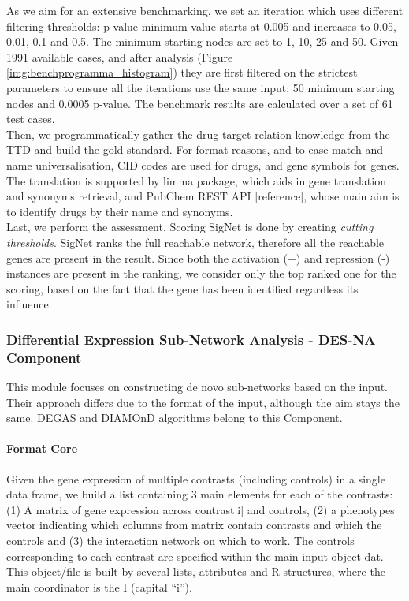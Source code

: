 As we aim for an extensive benchmarking, we set an iteration which uses different filtering thresholds: p-value minimum value starts at 0.005 and increases to 0.05, 0.01, 0.1 and 0.5. The minimum starting nodes are set to 1, 10, 25 and 50. Given 1991 available cases, and after analysis (Figure \ref{img:benchprogramma_histogram}) they are first filtered on the strictest parameters to ensure all the iterations use the same input: 50 minimum starting nodes and 0.0005 p-value. The benchmark results are calculated over a set of 61 test cases.
\\

Then, we programmatically gather the drug-target relation knowledge from the TTD and build the gold standard. For format reasons, and to ease match and name universalisation, CID codes are used for drugs, and gene symbols for genes. The translation is supported by limma package, which aids in gene translation and synonyms retrieval, and PubChem REST API [reference], whose main aim is to identify drugs by their name and synonyms.
\\

Last, we perform the assessment. Scoring SigNet is done by creating \textit{cutting thresholds}. SigNet ranks the full reachable network, therefore all the reachable genes are present in the result. Since both the activation (+) and repression (-) instances are present in the ranking, we consider only the top ranked one for the scoring, based on the fact that the gene has been identified regardless its influence.
\\

\subsubsection{Differential Expression Sub-Network Analysis - DES-NA Component}

This module focuses on constructing de novo sub-networks based on the input. Their approach differs due to the format of the input, although the aim stays the same. DEGAS and DIAMOnD algorithms belong to this Component.

\paragraph{Format Core}
Given the gene expression of multiple contrasts (including controls) in a single data frame, we build a list containing 3 main elements for each of the contrasts: (1) A matrix of gene expression across contrast[i] and controls, (2) a phenotypes vector indicating which columns from matrix contain contrasts and which the controls and (3) the interaction network on which to work.
The controls corresponding to each contrast are specified within the main input object dat. This object/file is built by several lists, attributes and R structures, where the main coordinator is the I (capital “i”).

